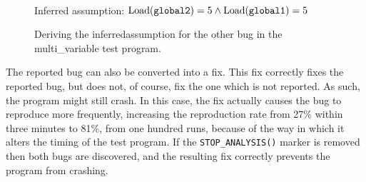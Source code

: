 \begin{figure}
  \centerline{
    {\hfill}
  {\hfill}
  \\
  {\hfill}
  }
  \vspace{12pt}
  \centerline{Inferred assumption: $\mathrm{Load}(\texttt{global2}) = 5 \wedge \mathrm{Load}(\texttt{global1}) = 5$}
  \caption{Deriving the \gls{inferredassumption} for the other bug in
    the multi\_variable test program.}
  \label{fig:eval:multi_variable:other_bug}
\end{figure}

The reported bug can also be converted into a fix.  This fix correctly
fixes the reported bug, but does not, of course, fix the one which is
not reported.  As such, the program might still crash.  In this case,
the fix actually causes the bug to reproduce more frequently,
increasing the reproduction rate from 27\% within three minutes to
81\%, from one hundred runs, because of the way in which it alters the
timing of the test program.  If the \texttt{STOP\_ANALYSIS()} marker
is removed then both bugs are discovered, and the resulting fix
correctly prevents the program from crashing.

